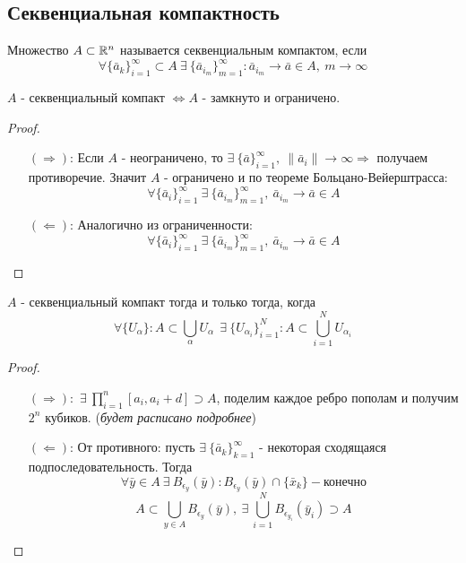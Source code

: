 \subsection{Секвенциальная компактность}
\begin{definition}
    Множество $A\subset \mathbb{R}^n$ называется секвенциальным компактом, если 
    \[\forall \{\bar{a}_k\}_{i=1}^{\infty}\subset A\ \exists\ \{\bar{a}_{i_m}\}_{m=1}^{\infty}: \bar{a}_{i_m}\to \bar{a} \in A,\ m\to \infty\]
\end{definition}  
\begin{theorem}
    $A$ - секвенциальный компакт $\Leftrightarrow A$ - замкнуто и ограничено. 
\end{theorem}
\begin{proof}\tab
    \begin{itemize}
        \item[$(\Rightarrow)$:] Если $A$ - неограничено, то $\exists\ \{\bar{a}\}_{i=1}^{\infty},\ \|\bar{a}_i\|\to \infty \Rightarrow$ получаем противоречие.
        Значит $A$ - ограничено и по теореме Больцано-Вейерштрасса:
        \[\forall \{\bar{a}_i\}_{i=1}^{\infty}\ \exists\ \{\bar{a}_{i_m}\}_{m=1}^{\infty},\ \bar{a}_{i_m} \to \bar{a}\in A\]
        \item[$(\Leftarrow)$:] Аналогично из ограниченности:
        \[\forall \{\bar{a}_i\}_{i=1}^{\infty}\ \exists\ \{\bar{a}_{i_m}\}_{m=1}^{\infty},\ \bar{a}_{i_m} \to \bar{a}\in A\]
    \end{itemize}
\end{proof} 
\begin{theorem}
    $A$ - секвенциальный компакт тогда и только тогда, когда
    \[\forall \{U_{\alpha}\}: A\subset \bigcup_{\alpha}U_{\alpha}\ \ \exists\ \{U_{\alpha_i}\}_{i=1}^N: A\subset \bigcup_{i=1}^N U_{\alpha_i}\]
\end{theorem} 
\begin{proof}\tab
    \begin{itemize}
        \item[$(\Rightarrow):$] $\exists\ \prod\limits_{i=1}^{n}[a_i, a_i+d]\supset A$, поделим каждое ребро пополам и получим $2^n$ кубиков.
        (\textit{будет расписано подробнее})
        \item[$(\Leftarrow)$:] От противного: пусть $\exists\ \{\bar{a}_k\}_{k=1}^{\infty}$ - некоторая сходящаяся подпоследовательность. Тогда 
        \[\forall \bar{y}\in A\ \exists\ B_{\epsilon_y}(\bar{y}): B_{\epsilon_y}(\bar{y})\cap \{\bar{x}_k\} - \text{конечно}\]
        \[A\subset \bigcup_{y\in A}B_{\epsilon_y}(\bar{y}),\ \exists\ \bigcup_{i=1}^N B_{\epsilon_{y_i}}(\bar{y}_i)\supset A\]
    \end{itemize}
\end{proof} 

